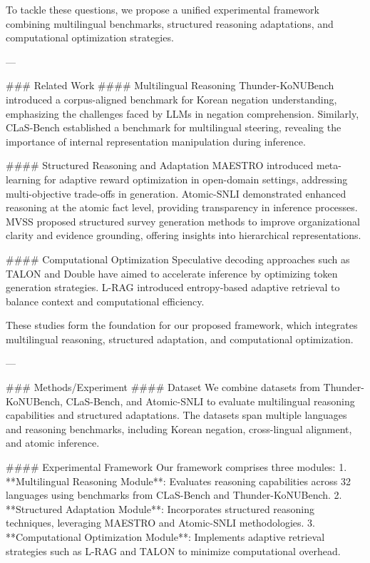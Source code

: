 To tackle these questions, we propose a unified experimental framework combining multilingual benchmarks, structured reasoning adaptations, and computational optimization strategies.

---

### Related Work  
#### Multilingual Reasoning  
Thunder-KoNUBench introduced a corpus-aligned benchmark for Korean negation understanding, emphasizing the challenges faced by LLMs in negation comprehension. Similarly, CLaS-Bench established a benchmark for multilingual steering, revealing the importance of internal representation manipulation during inference.

#### Structured Reasoning and Adaptation  
MAESTRO introduced meta-learning for adaptive reward optimization in open-domain settings, addressing multi-objective trade-offs in generation. Atomic-SNLI demonstrated enhanced reasoning at the atomic fact level, providing transparency in inference processes. MVSS proposed structured survey generation methods to improve organizational clarity and evidence grounding, offering insights into hierarchical representations.

#### Computational Optimization  
Speculative decoding approaches such as TALON and Double have aimed to accelerate inference by optimizing token generation strategies. L-RAG introduced entropy-based adaptive retrieval to balance context and computational efficiency.

These studies form the foundation for our proposed framework, which integrates multilingual reasoning, structured adaptation, and computational optimization.

---

### Methods/Experiment  
#### Dataset  
We combine datasets from Thunder-KoNUBench, CLaS-Bench, and Atomic-SNLI to evaluate multilingual reasoning capabilities and structured adaptations. The datasets span multiple languages and reasoning benchmarks, including Korean negation, cross-lingual alignment, and atomic inference.

#### Experimental Framework  
Our framework comprises three modules:  
1. **Multilingual Reasoning Module**: Evaluates reasoning capabilities across 32 languages using benchmarks from CLaS-Bench and Thunder-KoNUBench.  
2. **Structured Adaptation Module**: Incorporates structured reasoning techniques, leveraging MAESTRO and Atomic-SNLI methodologies.  
3. **Computational Optimization Module**: Implements adaptive retrieval strategies such as L-RAG and TALON to minimize computational overhead.  

